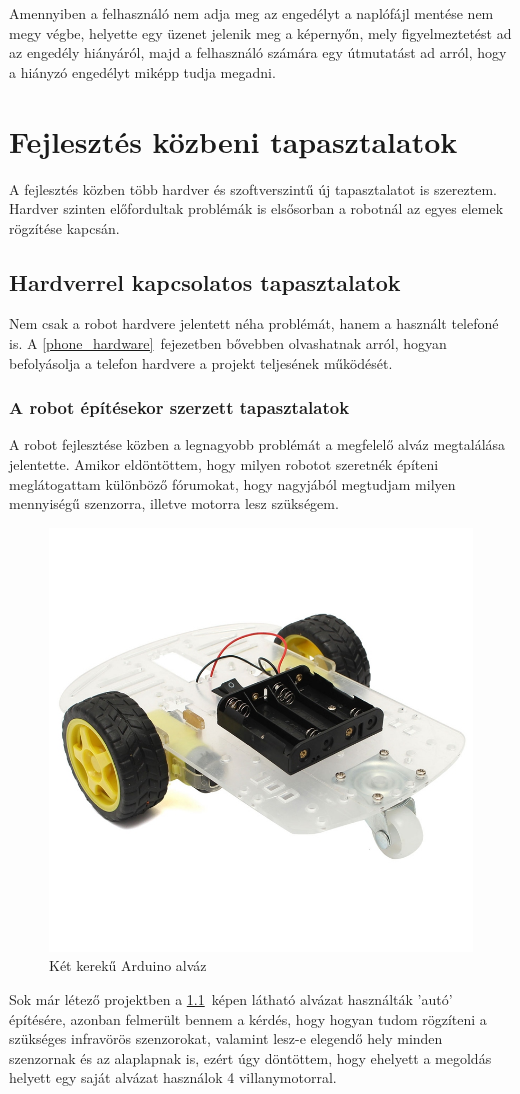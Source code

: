\documentclass[]{thesis-ekf}
\theoremstyle{definition}
\begin{document}
Amennyiben a felhasználó nem adja meg az engedélyt a naplófájl mentése nem megy végbe, helyette egy üzenet jelenik meg a képernyőn, mely figyelmeztetést ad az engedély hiányáról, majd a felhasználó számára egy útmutatást ad arról, hogy a hiányzó engedélyt miképp tudja megadni.

\chapter{Fejlesztés közbeni tapasztalatok}
A fejlesztés közben több hardver és szoftverszintű új tapasztalatot is szereztem. Hardver szinten előfordultak problémák is elsősorban a robotnál az egyes elemek rögzítése kapcsán.
\section{Hardverrel kapcsolatos tapasztalatok}
Nem csak a robot hardvere jelentett néha problémát, hanem a használt telefoné is. A \ref{phone_hardware}~fejezetben bővebben olvashatnak arról, hogyan befolyásolja a telefon hardvere a projekt teljesének működését.
\subsection{A robot építésekor szerzett tapasztalatok}
A robot fejlesztése közben a legnagyobb problémát a megfelelő alváz megtalálása jelentette.
Amikor eldöntöttem, hogy milyen robotot szeretnék építeni meglátogattam különböző fórumokat, hogy nagyjából megtudjam milyen mennyiségű szenzorra, illetve motorra lesz szükségem.
\begin{figure}[h]
	\centering
	\includegraphics[width=0.4\linewidth]{images/robot_build/2_wheel_car}
	\caption{Két kerekű Arduino alváz}
	\label{2_wheeler}
\end{figure}

Sok már létező projektben a \ref{2_wheeler}~képen látható alvázat használták 'autó' építésére, azonban felmerült bennem a kérdés, hogy hogyan tudom rögzíteni a szükséges infravörös szenzorokat, valamint lesz-e elegendő hely minden szenzornak és az alaplapnak is, ezért úgy döntöttem, hogy ehelyett a megoldás helyett egy saját alvázat használok 4 villanymotorral.
\end{document}
